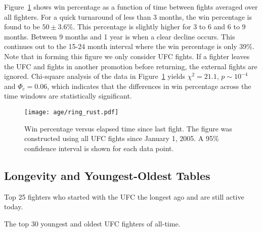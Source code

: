Figure~\ref{ring_rust} shows win percentage as a function
of time between fights averaged over all fighters.
For a quick turnaround of less than 3 months, the win percentage
is found to be $50\pm3.6\%$. This percentage is slightly
higher for 3 to 6 and 6 to 9 months.  Between 9 months
and 1 year is when a clear decline occurs. This continues
out to the 15-24 month interval where the win percentage
is only 39\%.
Note that in forming this figure we only consider UFC fights. If a fighter
leaves the UFC and fights in another promotion before returning, the
external fights are ignored. Chi-square analysis of the
data in Figure~\ref{ring_rust} yields
$\chi^2=21.1$, $p \sim 10^{-4}$ and $\Phi_c=0.06$, which
indicates that the differences in win percentage across the
time windows are statistically significant.

\begin{figure}[h]
\begin{center}
\texttt{[image: age/ring\_rust.pdf]}
\caption{Win percentage versus elapsed time since last fight. The figure
was constructed using all UFC fights since January 1, 2005. A
95\% confidence interval is shown for each data point.}
\label{ring_rust}
\end{center}
\end{figure}

\clearpage
\subsection*{Longevity and Youngest-Oldest Tables}

\begin{center}
\begin{table}[h]

\caption{Top 25 fighters who started with the UFC the longest ago and are still active today.}
\end{table}
\end{center}

\begin{center}
\begin{table}[h]

\caption{The top 30 youngest and oldest UFC fighters of all-time.}
\end{table}
\end{center}
